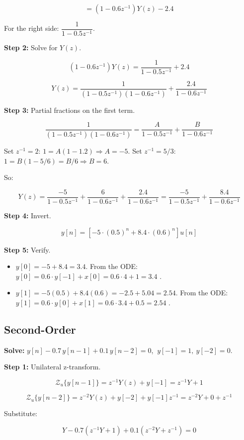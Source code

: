 \documentclass[11pt]{article}
\begin{document}
\[= (1 - 0.6 z^{-1}) Y(z) - 2.4\]

For the right side: $\dfrac{1}{1 - 0.5 z^{-1}}$.

\textbf{Step 2:} Solve for $Y(z)$.

\[(1 - 0.6 z^{-1}) Y(z) = \frac{1}{1 - 0.5 z^{-1}} + 2.4\]

\[Y(z) = \frac{1}{(1 - 0.5 z^{-1})(1 - 0.6 z^{-1})} + \frac{2.4}{1 - 0.6 z^{-1}}\]

\textbf{Step 3:} Partial fractions on the first term.

\[\frac{1}{(1 - 0.5 z^{-1})(1 - 0.6 z^{-1})} = \frac{A}{1 - 0.5 z^{-1}} + \frac{B}{1 - 0.6 z^{-1}}\]

Set $z^{-1} = 2$: $1 = A(1 - 1.2) \Rightarrow A = -5$.
Set $z^{-1} = 5/3$: $1 = B(1 - 5/6) = B/6 \Rightarrow B = 6$.

So:

\[Y(z) = \frac{-5}{1 - 0.5 z^{-1}} + \frac{6}{1 - 0.6 z^{-1}} + \frac{2.4}{1 - 0.6 z^{-1}} = \frac{-5}{1 - 0.5 z^{-1}} + \frac{8.4}{1 - 0.6 z^{-1}}\]

\textbf{Step 4:} Invert.

\[y[n] = \left[-5 \cdot (0.5)^n + 8.4 \cdot (0.6)^n\right] u[n]\]

\textbf{Step 5:} Verify.

\begin{itemize}
  \item $y[0] = -5 + 8.4 = 3.4$. From the ODE: $y[0] = 0.6 \cdot y[-1] + x[0] = 0.6 \cdot 4 + 1 = 3.4$ \checkmark.
  \item $y[1] = -5(0.5) + 8.4(0.6) = -2.5 + 5.04 = 2.54$. From the ODE: $y[1] = 0.6 \cdot y[0] + x[1] = 0.6 \cdot 3.4 + 0.5 = 2.54$ \checkmark.
\end{itemize}

\subsection*{Second-Order}

\textbf{Solve:} $y[n] - 0.7\, y[n-1] + 0.1\, y[n-2] = 0$, $\ y[-1] = 1, \ y[-2] = 0$.

\textbf{Step 1:} Unilateral z-transform.

\[\mathcal{Z}_u\{y[n-1]\} = z^{-1} Y(z) + y[-1] = z^{-1} Y + 1\]

\[\mathcal{Z}_u\{y[n-2]\} = z^{-2} Y(z) + y[-2] + y[-1] z^{-1} = z^{-2} Y + 0 + z^{-1}\]

Substitute:

\[Y - 0.7(z^{-1} Y + 1) + 0.1(z^{-2} Y + z^{-1}) = 0\]
\end{document}
